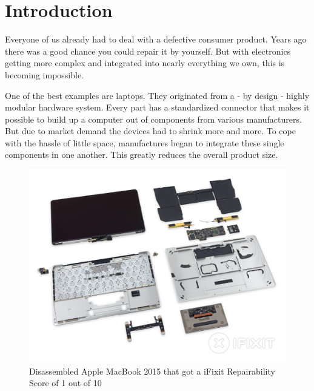 
\chapter{Introduction}

	Everyone of us already had to deal with a defective consumer product. Years ago there was a good chance you could repair it by yourself. But with electronics getting more complex and integrated into nearly everything we own, this is becoming impossible.
	
	One of the best examples are laptops. They originated from a - by design - highly modular hardware system. Every part has a standardized connector that makes it possible to build up a computer out of components from various manufacturers. But due to market demand the devices had to shrink more and more. To cope with the hassle of little space, manufactures began to integrate these single components in one another. This greatly reduces the overall product size.
	
	\begin{figure}[H]
		\includegraphics[width=\textwidth, trim=0 0 0 3cm, clip]{../images/ifixit-macbook-parts.jpg}
		\centering
		\caption[Disassembled Apple MacBook 2015 that got a iFixit Repairability Score of 1 out of 10]{Disassembled Apple MacBook 2015 that got a iFixit Repairability Score of 1 out of 10\footnotemark}
		\label{fig:ifixit-macbook-parts}
	\end{figure}
	
